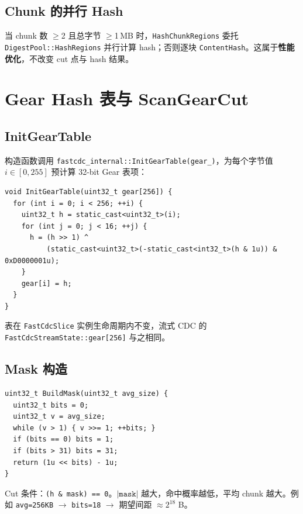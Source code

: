 \subsection{Chunk 的并行 Hash}

当 chunk 数 $\geq$2 且总字节 $\geq$1\,MB 时，\texttt{HashChunkRegions} 委托 \texttt{DigestPool::HashRegions} 并行计算 hash；否则逐块 \texttt{ContentHash}。这属于\textbf{性能优化}，不改变 cut 点与 hash 结果。

\section{Gear Hash 表与 ScanGearCut}
\label{sec:gear-mask}

\subsection{InitGearTable}

构造函数调用 \texttt{fastcdc\_internal::InitGearTable(gear\_)}，为每个字节值 $i \in [0,255]$ 预计算 32-bit Gear 表项：

\begin{lstlisting}[caption={Gear 表初始化（\filepath{fast\_cdc\_simd.cc}）},label={lst:gear-init}]
void InitGearTable(uint32_t gear[256]) {
  for (int i = 0; i < 256; ++i) {
    uint32_t h = static_cast<uint32_t>(i);
    for (int j = 0; j < 16; ++j) {
      h = (h >> 1) ^
          (static_cast<uint32_t>(-static_cast<int32_t>(h & 1u)) & 0xD0000001u);
    }
    gear[i] = h;
  }
}
\end{lstlisting}

表在 \texttt{FastCdcSlice} 实例生命周期内不变，流式 CDC 的 \texttt{FastCdcStreamState::gear[256]} 与之相同。

\subsection{Mask 构造}

\begin{lstlisting}[caption={BuildMask：由 avg\_size 推导命中概率},label={lst:build-mask}]
uint32_t BuildMask(uint32_t avg_size) {
  uint32_t bits = 0;
  uint32_t v = avg_size;
  while (v > 1) { v >>= 1; ++bits; }
  if (bits == 0) bits = 1;
  if (bits > 31) bits = 31;
  return (1u << bits) - 1u;
}
\end{lstlisting}

Cut 条件：\texttt{(h \& mask) == 0}。$|\texttt{mask}|$ 越大，命中概率越低，平均 chunk 越大。例如 \texttt{avg=256KB} $\rightarrow$ \texttt{bits=18} $\rightarrow$ 期望间距 $\approx 2^{18}$ B。

